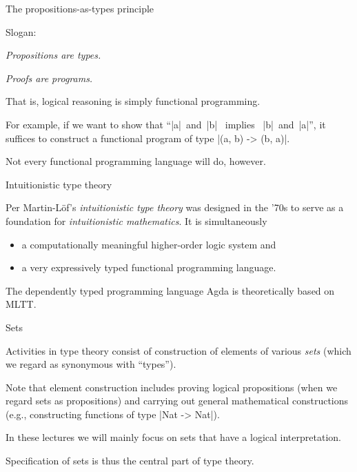 \documentclass[t,compress,hyperref={hidelinks}]{beamer}
\begin{document}
\begin{frame}{The propositions-as-types principle}

Slogan:
\begin{center}
\emph{Propositions are types.}

\emph{Proofs are programs.}
\end{center}

That is, logical reasoning is simply functional programming.

For example, if we want to show that ``|a|~and~|b| ~implies~ |b|~and~|a|'', it suffices to construct a functional program of type |(a, b) -> (b, a)|.

Not every functional programming language will do, however.

\end{frame}

\begin{frame}{Intuitionistic type theory}

Per Martin-Löf's \emph{intuitionistic type theory} was designed in the '70s to serve as a foundation for \emph{intuitionistic mathematics}.
It is simultaneously
\begin{itemize}
\item a computationally meaningful higher-order logic system and
\item a very expressively typed functional programming language.
\end{itemize}

The dependently typed programming language Agda is theoretically based on MLTT.

\end{frame}

\begin{frame}{Sets}

Activities in type theory consist of construction of elements of various \emph{sets} (which we regard as synonymous with ``types'').

Note that element construction includes proving logical propositions (when we regard sets as propositions) and carrying out general mathematical constructions (e.g., constructing functions of type |Nat -> Nat|).

In these lectures we will mainly focus on sets that have a logical interpretation.

Specification of sets is thus the central part of type theory.

\end{frame}
\end{document}
